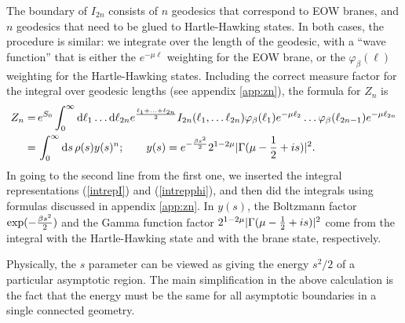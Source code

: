 \documentclass[12pt]{article}
\newcommand{\be}{\begin{equation}}
\newcommand{\ee}{\end{equation}}
\numberwithin{equation}{section}
\begin{document}
The boundary of $I_{2n}$ consists of $n$ geodesics that correspond to EOW branes, and $n$ geodesics that need to be glued to Hartle-Hawking states. In both cases, the procedure is similar: we integrate over the length of the geodesic, with a ``wave function'' that is either the $e^{-\mu\ell}$ weighting for the EOW brane, or the $\varphi_\beta(\ell)$ weighting for the Hartle-Hawking states. Including the correct measure factor for the integral over geodesic lengths (see appendix \ref{app:zn}), the formula for $Z_n$ is
\be
\begin{split}
	Z_n=\,&e^{S_0}\int_0^\infty \mathrm{d}\ell_1 \dots\mathrm{d}\ell_{2n}e^{\ell_{1}+...+\ell_{2n}\over 2} I_{2n}(\ell_1,\dots\ell_{2n})\varphi_{\beta}(\ell_{1})e^{-\mu\ell_2}\dots\varphi_{\beta}(\ell_{2n-1})e^{-\mu \ell_{2n}}\\
	=\,&\int_0^\infty \mathrm{d}s\, \rho(s) y(s)^n;\hspace{20pt} y(s)=e^{-{\beta s^2\over 2}}2^{1-2\mu}|\Gamma(\mu-{1\over 2}+is)|^2.\label{finalZn}
\end{split}
\ee
In going to the second line from the first one, we inserted the integral representations (\ref{intrepI}) and (\ref{intrepphi}), and then did the integrals using formulas discussed in appendix \ref{app:zn}. In $y(s)$, the Boltzmann factor $\exp(-{\beta s^2\over 2})$ and the Gamma function factor $2^{1-2\mu}|\Gamma(\mu-{1\over 2}+is)|^2$ come from the integral with the Hartle-Hawking state and with the brane state, respectively.

Physically, the $s$ parameter can be viewed as giving the energy $s^2/2$ of a particular asymptotic region. The main simplification in the above calculation is the fact that the energy must be the same for all asymptotic boundaries in a single connected geometry.

\end{document}
